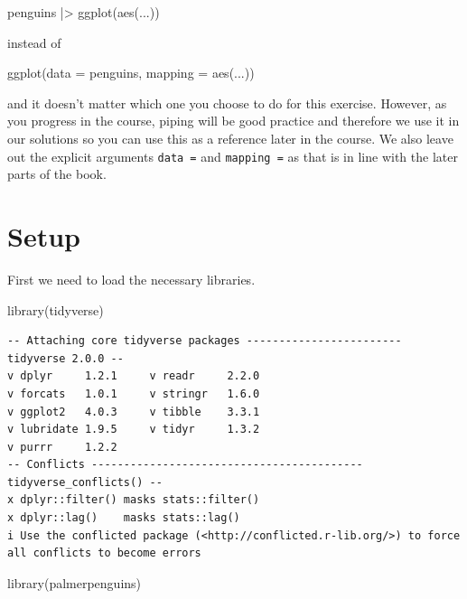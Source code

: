 \documentclass[
  letterpaper,
  DIV=11,
  numbers=noendperiod]{scrreprt}
\newenvironment{Shaded}{\begin{snugshade}}{\end{snugshade}}
\newcommand{\AttributeTok}[1]{\textcolor[rgb]{0.40,0.45,0.13}{#1}}
\newcommand{\FunctionTok}[1]{\textcolor[rgb]{0.28,0.35,0.67}{#1}}
\newcommand{\NormalTok}[1]{\textcolor[rgb]{0.00,0.23,0.31}{#1}}
\newcommand{\SpecialCharTok}[1]{\textcolor[rgb]{0.37,0.37,0.37}{#1}}
\begin{document}
\begin{Shaded}
\begin{Highlighting}[]
\NormalTok{penguins }\SpecialCharTok{|\textgreater{}}
  \FunctionTok{ggplot}\NormalTok{(}\FunctionTok{aes}\NormalTok{(...))}
\end{Highlighting}
\end{Shaded}

instead of

\begin{Shaded}
\begin{Highlighting}[]
\FunctionTok{ggplot}\NormalTok{(}\AttributeTok{data =}\NormalTok{ penguins, }\AttributeTok{mapping =} \FunctionTok{aes}\NormalTok{(...))}
\end{Highlighting}
\end{Shaded}

and it doesn't matter which one you choose to do for this exercise.
However, as you progress in the course, piping will be good practice and
therefore we use it in our solutions so you can use this as a reference
later in the course. We also leave out the explicit arguments
\texttt{data\ =} and \texttt{mapping\ =} as that is in line with the
later parts of the book.

\section{Setup}\label{setup}

First we need to load the necessary libraries.

\begin{Shaded}
\begin{Highlighting}[]
\FunctionTok{library}\NormalTok{(tidyverse)}
\end{Highlighting}
\end{Shaded}

\begin{verbatim}
-- Attaching core tidyverse packages ------------------------ tidyverse 2.0.0 --
v dplyr     1.2.1     v readr     2.2.0
v forcats   1.0.1     v stringr   1.6.0
v ggplot2   4.0.3     v tibble    3.3.1
v lubridate 1.9.5     v tidyr     1.3.2
v purrr     1.2.2     
-- Conflicts ------------------------------------------ tidyverse_conflicts() --
x dplyr::filter() masks stats::filter()
x dplyr::lag()    masks stats::lag()
i Use the conflicted package (<http://conflicted.r-lib.org/>) to force all conflicts to become errors
\end{verbatim}

\begin{Shaded}
\begin{Highlighting}[]
\FunctionTok{library}\NormalTok{(palmerpenguins)}
\end{Highlighting}
\end{Shaded}
\end{document}
